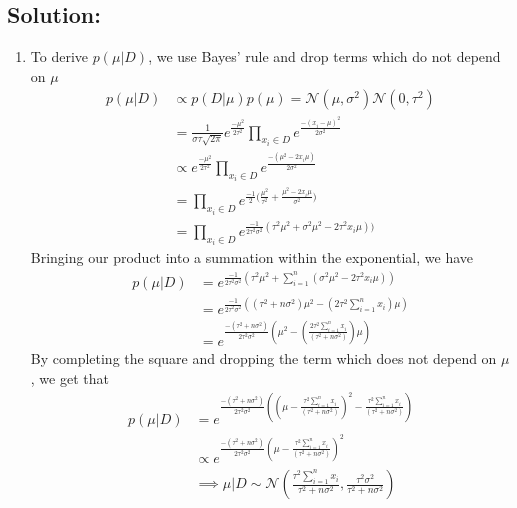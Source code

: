 \documentclass[submit]{harvardml}
\begin{document}
\subsection*{Solution:}
\begin{enumerate}
    \item To derive $p(\mu | D)$, we use Bayes' rule and drop terms which do not depend on $\mu$
    \begin{align}
        p(\mu | D) &\propto p(D| \mu) p(\mu) = \mathcal{N}(\mu,  \sigma^2) \mathcal{N}(0, \tau^2) \\
        &= \frac{1}{\sigma\tau \sqrt{2 \pi}} e^{\frac{-\mu^2}{2\tau^2}} \prod_{x_i \in D} e^\frac{-(x_i - \mu)^2}{2\sigma^2} \\
        & \propto e^{\frac{-\mu^2}{2\tau^2}} \prod_{x_i \in D} e^\frac{-(\mu^2 - 2x_i \mu)}{2\sigma^2} \\
        &= \prod_{x_i \in D} e^{\frac{-1}{2}{(\frac{\mu^2}{\tau^2} + \frac{\mu^2 - 2x_i \mu}{\sigma^2}})} \\
        &= \prod_{x_i \in D} e^{\frac{-1}{2\tau^2 \sigma^2}(\tau^2 \mu^2  + \sigma^2 \mu^2 - 2\tau^2 x_i\mu))}
    \end{align}
    Bringing our product into a summation within the exponential, we have
    \begin{align}
        p(\mu | D) &= e^{\frac{-1}{2\tau^2 \sigma^2}(\tau^2 \mu^2  + \sum_{i=1}^n(\sigma^2 \mu^2 - 2\tau^2 x_i\mu))} \\
        &= e^{\frac{-1}{2\tau^2 \sigma^2}((\tau^2 + n \sigma^2)\mu^2 - (2\tau^2 \sum_{i=1}^n x_i)\mu)} \\
        &= e^{\frac{-(\tau^2 + n \sigma^2)}{2\tau^2 \sigma^2}(\mu^2 - (\frac{2\tau^2 \sum_{i=1}^n x_i}{(\tau^2 + n \sigma^2)})\mu)}
    \end{align}
    By completing the square and dropping the term which does not depend on $\mu$, we get that 
    \begin{align}
        p(\mu | D) &= e^{\frac{-(\tau^2 + n \sigma^2)}{2\tau^2 \sigma^2}((\mu - \frac{\tau^2 \sum_{i=1}^n x_i}{(\tau^2 + n \sigma^2)})^2 - \frac{\tau^2 \sum_{i=1}^n x_i}{(\tau^2 + n \sigma^2)})} \\
        &\propto e^{\frac{-(\tau^2 + n \sigma^2)}{2\tau^2 \sigma^2}(\mu - \frac{\tau^2 \sum_{i=1}^n x_i}{(\tau^2 + n \sigma^2)})^2} \\
        & \implies \mu | D \sim \mathcal{N}(\frac{\tau^2 \sum_{i=1}^n x_i}{\tau^2 + n \sigma^2}, \frac{\tau^2 \sigma^2}{\tau^2 + n\sigma^2})
    \end{align}
    

\end{enumerate}
\end{document}

